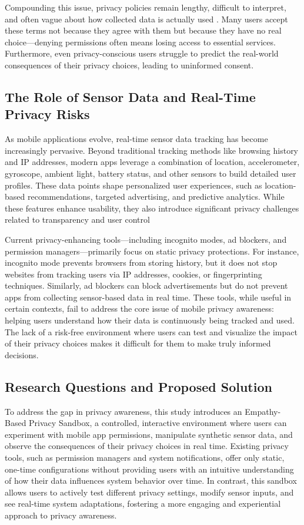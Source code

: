 \documentclass[acmlarge, nonacm]{acmart}
\begin{document}
Compounding this issue, privacy policies remain lengthy, difficult to interpret, and often vague about how collected data is actually used \cite{ObarandOeldorf-Hirsch2020}. Many users accept these terms not because they agree with them but because they have no real choice—denying permissions often means losing access to essential services. Furthermore, even privacy-conscious users struggle to predict the real-world consequences of their privacy choices, leading to uninformed consent.

\subsection{The Role of Sensor Data and Real-Time Privacy Risks}

As mobile applications evolve, real-time sensor data tracking has become increasingly pervasive. Beyond traditional tracking methods like browsing history and IP addresses, modern apps leverage a combination of location, accelerometer, gyroscope, ambient light, battery status, and other sensors to build detailed user profiles. These data points shape personalized user experiences, such as location-based recommendations, targeted advertising, and predictive analytics. While these features enhance usability, they also introduce significant privacy challenges related to transparency and user control \cite{rathi2025predictive}

Current privacy-enhancing tools—including incognito modes, ad blockers, and permission managers—primarily focus on static privacy protections. For instance, incognito mode prevents browsers from storing history, but it does not stop websites from tracking users via IP addresses, cookies, or fingerprinting techniques. Similarly, ad blockers can block advertisements but do not prevent apps from collecting sensor-based data in real time. These tools, while useful in certain contexts, fail to address the core issue of mobile privacy awareness: helping users understand how their data is continuously being tracked and used. The lack of a risk-free environment where users can test and visualize the impact of their privacy choices makes it difficult for them to make truly informed decisions.

\subsection{Research Questions and Proposed Solution}

To address the gap in privacy awareness, this study introduces an Empathy-Based Privacy Sandbox, a controlled, interactive environment where users can experiment with mobile app permissions, manipulate synthetic sensor data, and observe the consequences of their privacy choices in real time. Existing privacy tools, such as permission managers and system notifications, offer only static, one-time configurations without providing users with an intuitive understanding of how their data influences system behavior over time. In contrast, this sandbox allows users to actively test different privacy settings, modify sensor inputs, and see real-time system adaptations, fostering a more engaging and experiential approach to privacy awareness.
\end{document}
